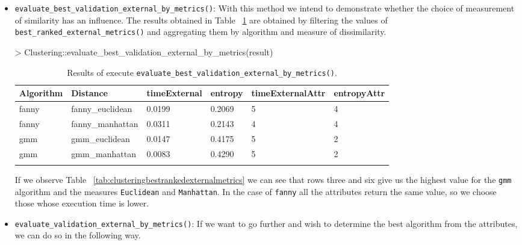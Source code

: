 \begin{itemize}
  \item \texttt{evaluate\_best\_validation\_external\_by\_metrics()}: With this method we intend to demonstrate whether the choice of measurement of similarity has an influence. The results obtained in Table ~\ref{tab:evaluatebestvalidationexternalbymetrics} are obtained by filtering the values of \texttt{best\_ranked\_external\_metrics()} and aggregating them by algorithm and measure of dissimilarity.
\begin{Schunk}
\begin{Sinput}
> Clustering::evaluate_best_validation_external_by_metrics(result)
\end{Sinput}
\end{Schunk}
{\small
\begin{longtable}{| p{1cm} | p{1.8cm} |  p{1.6cm} | p{0.8cm} | p{1.9cm} | p{1.8cm} |}
\hline
\scriptsize  Algorithm & \scriptsize    Distance     & \scriptsize timeExternal & \scriptsize entropy & \scriptsize timeExternalAttr & \scriptsize entropyAttr \\
\hline
\scriptsize   fanny    & \scriptsize fanny\_euclidean & \scriptsize    0.0199    & \scriptsize  0.2069 & \scriptsize        5         & \scriptsize     4 \\
\cline{2-6}
\scriptsize   fanny    & \scriptsize fanny\_manhattan & \scriptsize    0.0311    & \scriptsize  0.2143 & \scriptsize        4         & \scriptsize     4 \\
\hline
\scriptsize    gmm     & \scriptsize  gmm\_euclidean  & \scriptsize    0.0147    & \scriptsize  0.4175 & \scriptsize        5         & \scriptsize     2 \\
\cline{2-6}
\scriptsize    gmm     & \scriptsize  gmm\_manhattan  & \scriptsize    0.0083    & \scriptsize   0.4290 & \scriptsize        5         & \scriptsize     2 \\
\hline
\caption{Results of execute \texttt{evaluate\_best\_validation\_external\_by\_metrics()}.}
\label{tab:evaluatebestvalidationexternalbymetrics}
\end{longtable}}
If we observe Table ~\ref{tab:clusteringbestrankedexternalmetrics} we can see that rows three and six give us the highest value for the \texttt{gmm} algorithm and the measures \texttt{Euclidean} and \texttt{Manhattan}. In the case of \texttt{fanny} all the attributes return the same value, so we choose those whose execution time is lower.
  \item \texttt{evaluate\_validation\_external\_by\_metrics()}: If we want to go further and wish to determine the best algorithm from the attributes, we can do so in the following way.


\end{itemize}
